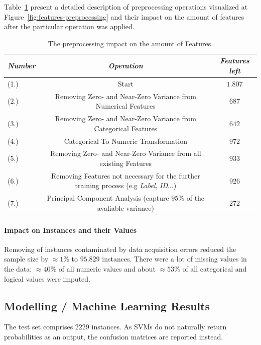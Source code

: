 Table~\ref{tab:feature-reduction} present a detailed description of preprocessing operations visualized at Figure~\ref{fig:features-preprocessing} and their impact on the amount of features after the particular operation was applied.
\begin{table}[h!]
  \begin{center} 
    \caption{The preprocessing impact on the amount of Features.}
    \label{tab:feature-reduction}
   \hspace*{-1cm} \begin{tabular}{|l|c|c|}\hline
    \textit{Number} & \textit{Operation} & \textit{Features left} \\
      \hline
     (1.) & Start & \(1.807\) \\ 
     \hline
     (2.) & Removing Zero- and Near-Zero Variance from Numerical Features  &  \(687\) \\
     \hline
     (3.) & Removing Zero- and Near-Zero Variance from Categorical Features &  \(642\) \\
     \hline
     (4.) & Categorical To Numeric Transformation &  \(972\) \\
     \hline
     (5.) &  Removing Zero- and Near-Zero Variance from all existing Features &  \(933\) \\
     \hline
     (6.) &  Removing Features not necessary for the further training process (e.g \textit{Label}, \textit{ID}...) &  \(926\) \\
     \hline
     (7.) & Principal Component Analysis (capture \(95\%\) of the avaliable variance) &  \(272\) \\
     \hline
    \end{tabular}
  \end{center}
\end{table}

\paragraph*{Impact on Instances and their Values} \hfill \break
Removing of instances contaminated by data acquisition errors reduced the sample size by \(\approx1\%\) to \(95.829\) instances. There were a lot of missing values in the data: $\approx40\%$ of all numeric values and about $\approx53\%$ of all categorical and logical values were imputed.

\subsection{Modelling / Machine Learning Results}
The test set comprises \(2229\) instances. As SVMs do not naturally return probabilities as an output, the confusion matrices are reported instead.

